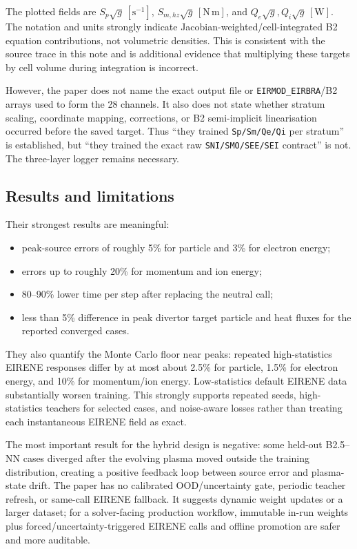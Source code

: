 \documentclass[11pt]{article}
\begin{document}
The plotted fields are \(S_p\sqrt{g}\,[\mathrm{s^{-1}}]\), \(S_{m,hz}\sqrt{g}\,[\mathrm{N\,m}]\), and \(Q_e\sqrt{g},Q_i\sqrt{g}\,[\mathrm{W}]\). The notation and units strongly indicate Jacobian-weighted/cell-integrated B2 equation contributions, not volumetric densities. This is consistent with the source trace in this note and is additional evidence that multiplying these targets by cell volume during integration is incorrect.

However, the paper does not name the exact output file or \texttt{EIRMOD\_EIRBRA}/B2 arrays used to form the 28 channels. It also does not state whether stratum scaling, coordinate mapping, corrections, or B2 semi-implicit linearisation occurred before the saved target. Thus ``they trained \texttt{Sp/Sm/Qe/Qi} per stratum'' is established, but ``they trained the exact raw \texttt{SNI/SMO/SEE/SEI} contract'' is not. The three-layer logger remains necessary.

\subsection{Results and limitations}

Their strongest results are meaningful:

\begin{itemize}
\item peak-source errors of roughly 5\% for particle and 3\% for electron energy;
\item errors up to roughly 20\% for momentum and ion energy;
\item 80--90\% lower time per step after replacing the neutral call;
\item less than 5\% difference in peak divertor target particle and heat fluxes for the reported converged cases.
\end{itemize}

They also quantify the Monte Carlo floor near peaks: repeated high-statistics EIRENE responses differ by at most about 2.5\% for particle, 1.5\% for electron energy, and 10\% for momentum/ion energy. Low-statistics default EIRENE data substantially worsen training. This strongly supports repeated seeds, high-statistics teachers for selected cases, and noise-aware losses rather than treating each instantaneous EIRENE field as exact.

The most important result for the hybrid design is negative: some held-out B2.5--NN cases diverged after the evolving plasma moved outside the training distribution, creating a positive feedback loop between source error and plasma-state drift. The paper has no calibrated OOD/uncertainty gate, periodic teacher refresh, or same-call EIRENE fallback. It suggests dynamic weight updates or a larger dataset; for a solver-facing production workflow, immutable in-run weights plus forced/uncertainty-triggered EIRENE calls and offline promotion are safer and more auditable.
\end{document}
